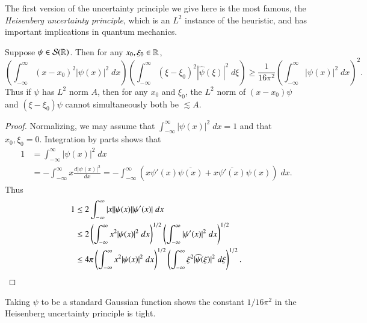 The first version of the uncertainty principle we give here is the most famous, the \emph{Heisenberg uncertainty principle}, which is an $L^2$ instance of the heuristic, and has important implications in quantum mechanics.

\begin{theorem}[Heisenberg]
    Suppose $\psi \in \mathcal{S}(\operatorname{\mathbb{R}})$. Then for any $x_0,\xi_0 \in \operatorname{\mathbb{R}}$,
    \[ \left( \int_{-\infty}^\infty (x - x_0)^2 |\psi(x)|^2\; dx \right) \left( \int_{-\infty}^\infty (\xi - \xi_0)^2 |\widehat{\psi}(\xi)|^2\; d\xi \right) \geq \frac{1}{16 \pi^2} \left( \int_{-\infty}^\infty |\psi(x)|^2\; dx \right)^2. \]
    Thus if $\psi$ has $L^2$ norm $A$, then for any $x_0$ and $\xi_0$, the $L^2$ norm of $(x - x_0) \psi$ and $(\xi - \xi_0) \psi$ cannot simultaneously both be $\lesssim A$.
\end{theorem}
\begin{proof}
    Normalizing, we may assume that $\int_{-\infty}^\infty |\psi(x)|^2\; dx = 1$ and that $x_0,\xi_0 = 0$. Integration by parts shows that
    \begin{align*}
        1 &= \int_{-\infty}^\infty |\psi(x)|^2\; dx\\
        &= - \int_{-\infty}^\infty x \frac{d|\psi(x)|^2}{dx} = - \int_{-\infty}^\infty (x \psi'(x) \overline{\psi(x)} + x \overline{\psi'(x)} \psi(x))\; dx.
    \end{align*}
    Thus
    \begin{align*}
        1 &\leq 2 \int_{-\infty}^\infty |x| |\psi(x)| |\psi'(x)|\; dx\\
        &\leq 2 \left( \int_{-\infty}^\infty x^2 |\psi(x)|^2\; dx \right)^{1/2} \left( \int_{-\infty}^\infty |\psi'(x)|^2\; dx \right)^{1/2}\\
        &\leq 4 \pi \left( \int_{-\infty}^\infty x^2 |\psi(x)|^2\; dx \right)^{1/2} \left( \int_{-\infty}^\infty \xi^2 |\widehat{\psi}(\xi)|^2\; d\xi \right)^{1/2}. \qedhere
    \end{align*}
\end{proof}

\begin{remark}
    Taking $\psi$ to be a standard Gaussian function shows the constant $1 / 16 \pi^2$ in the Heisenberg uncertainty principle is tight.
\end{remark}

